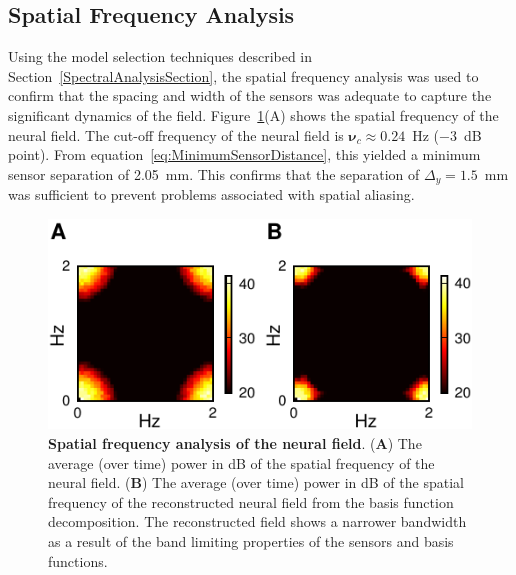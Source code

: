 \documentclass[10pt]{article}
\begin{document}
\subsection*{Spatial Frequency Analysis} 
Using the model selection techniques described in Section~\ref{SpectralAnalysisSection}, the spatial frequency analysis was used to confirm that the spacing and width of the sensors was adequate to capture the significant dynamics of the field. Figure~\ref{fig:FFTTrueEstimate}(A) shows the spatial frequency of the neural field. The cut-off frequency of the neural field is $\boldsymbol{\nu}_c \approx 0.24$~Hz ($-3$~dB point). From equation~\ref{eq:MinimumSensorDistance}, this yielded a minimum sensor separation of 2.05~mm. This confirms that the separation of $\Delta_{y} = 1.5$~mm was sufficient to prevent problems associated with spatial aliasing.
\begin{figure}
\centering
\label{fig:FieldFFT}\includegraphics{./Graph/FFTField.pdf}
\caption{{\bf Spatial frequency analysis of the neural field}. (\textbf{A}) The average (over time) power in dB of the spatial frequency of the neural field. (\textbf{B}) The average (over time) power in dB of the spatial frequency of the reconstructed neural field from the basis function decomposition. The reconstructed field shows a narrower bandwidth as a result of the band limiting properties of the sensors and basis functions.}
\label{fig:FFTTrueEstimate}
\end{figure}
\end{document}
